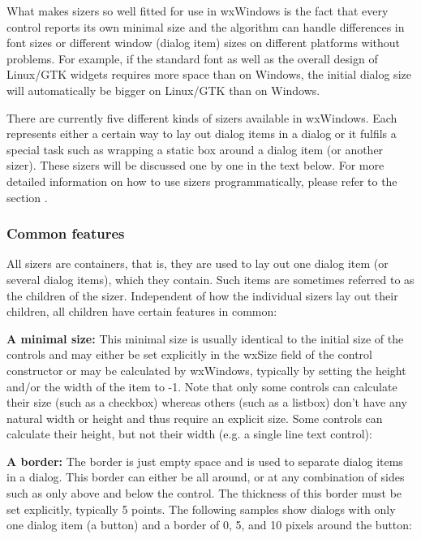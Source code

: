 What makes sizers so well fitted for use in wxWindows is the fact that every control
reports its own minimal size and the algorithm can handle differences in font sizes
or different window (dialog item) sizes on different platforms without problems. For example, if
the standard font as well as the overall design of Linux/GTK widgets requires more space than
on Windows, the initial dialog size will automatically be bigger on Linux/GTK than on Windows.

There are currently five different kinds of sizers available in wxWindows. Each represents
either a certain way to lay out dialog items in a dialog or it fulfils a special task
such as wrapping a static box around a dialog item (or another sizer). These sizers will
be discussed one by one in the text below. For more detailed information on how to use sizers
programmatically, please refer to the section .

\subsubsection{Common features}\label{sizerscommonfeatures}

All sizers are containers, that is, they are used to lay out one dialog item (or several
dialog items), which they contain. Such items are sometimes referred to as the children
of the sizer. Independent of how the individual sizers lay out their children, all children
have certain features in common:

{\bf A minimal size:} This minimal size is usually identical to
the initial size of the controls and may either be set explicitly in the wxSize field
of the control constructor or may be calculated by wxWindows, typically by setting
the height and/or the width of the item to -1. Note that only some controls can
calculate their size (such as a checkbox) whereas others (such as a listbox)
don't have any natural width or height and thus require an explicit size. Some controls
can calculate their height, but not their width (e.g. a single line text control):

\newcommand{\myimage}[1]{\mbox{\image{0cm;0cm}{#1}}}

\begin{center}
\myimage{sizer03.eps}\gifsep
\myimage{sizer04.eps}\gifsep
\myimage{sizer05.eps}
\end{center}

{\bf A border:} The border is just empty space and is used to separate dialog items
in a dialog. This border can either be all around, or at any combination of sides
such as only above and below the control. The thickness of this border must be set
explicitly, typically 5 points. The following samples show dialogs with only one
dialog item (a button) and a border of 0, 5, and 10 pixels around the button:

